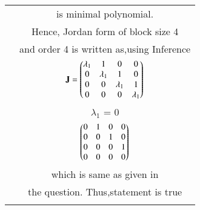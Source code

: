 \documentclass[journal,12pt,twocolumn]{IEEEtran}
\begin{document}
\begin{table}[h!]
\begin{center}
\begin{tabular}{|c|c|}
& is minimal polynomial.\\
& Hence, Jordan form of block size 4\\
& and order 4 is written as,using Inference\\
& $\mathbf{J} = \begin{pmatrix}\lambda_1 & 1 & 0 & 0 \\ 
                        0 & \lambda_1 & 1 & 0\\ 
                        0 & 0 & \lambda_1 & 1\\
                        0 & 0 & 0 & \lambda_1 \end{pmatrix}$ \\
& $\lambda_1$ = 0 \\ 
& $\begin{pmatrix}0&1&0&0\\
       0&0&1&0\\
       0&0&0&1\\
       0&0&0&0\end{pmatrix}$\\
& which is same as given in\\
& the question. Thus,statement is true \\
& \\
\hline
\end{tabular}
\end{center}
\end{table}
\end{document}
